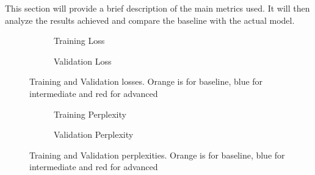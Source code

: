This section will provide a brief description of the main metrics used. It will then analyze the results achieved and compare the baseline with the actual model.
\begin{figure}[t]
     \centering
     \begin{subfigure}[b]{0.2\textwidth}
         \centering
         
         \caption{Training Loss}
         \label{fig:TrainLoss}
     \end{subfigure}
     \hfill
     \begin{subfigure}[b]{0.2\textwidth}
         \centering
         
         \caption{Validation Loss}
         \label{fig:ValidLoss}
     \end{subfigure}
        \caption{Training and Validation losses. Orange is for baseline, blue for intermediate and red for advanced}
        \label{fig:Losses}
\end{figure}

\begin{figure}[t]
     \centering
     \begin{subfigure}[b]{0.2\textwidth}
         \centering
         
         \caption{Training Perplexity}
         \label{fig:TrainingPP}
     \end{subfigure}
     \hfill
     \begin{subfigure}[b]{0.2\textwidth}
         \centering
         
         \caption{Validation Perplexity}
         \label{fig:ValidPP}
     \end{subfigure}
        \caption{Training and Validation perplexities. Orange is for baseline, blue for intermediate and red for advanced}
        \label{fig:Perplexities}
\end{figure}

